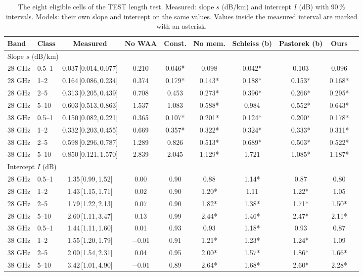 \documentclass[reprint,aps,pra,amsmath,amssymb,nofootinbib,superscriptaddress]{revtex4-2}
\newcommand{\iv}[2]{\,[#1,\,#2]}
\begin{document}
\begin{table}[t]
\caption{The eight eligible cells of the TEST length test. Measured: slope $s$ (dB/km) and intercept $I$ (dB) with 90\,\%
intervals. Models: their own slope and intercept on the same values. Values inside the measured interval are marked with an
asterisk.}
\label{tab:cells}
\begin{ruledtabular}
\begin{tabular}{llcccccccc}
Band & Class & Measured & No WAA & Const. & No mem. & Schleiss (b) & Pastorek (b) & Ours\\
\hline
\multicolumn{9}{l}{Slope $s$ (dB/km)}\\
28 GHz & 0.5--1 & 0.037\iv{0.014}{0.077} & 0.210 & 0.046* & 0.098 & 0.042* & 0.103 & 0.096\\
28 GHz & 1--2 & 0.164\iv{0.086}{0.234} & 0.374 & 0.179* & 0.143* & 0.188* & 0.153* & 0.168*\\
28 GHz & 2--5 & 0.313\iv{0.205}{0.439} & 0.708 & 0.453 & 0.273* & 0.396* & 0.266* & 0.295*\\
28 GHz & 5--10 & 0.603\iv{0.513}{0.863} & 1.537 & 1.083 & 0.588* & 0.984 & 0.552* & 0.643*\\
38 GHz & 0.5--1 & 0.150\iv{0.082}{0.221} & 0.365 & 0.107* & 0.201* & 0.124* & 0.200* & 0.178*\\
38 GHz & 1--2 & 0.332\iv{0.203}{0.455} & 0.669 & 0.357* & 0.322* & 0.324* & 0.333* & 0.311*\\
38 GHz & 2--5 & 0.598\iv{0.296}{0.787} & 1.289 & 0.826 & 0.513* & 0.689* & 0.503* & 0.522*\\
38 GHz & 5--10 & 0.850\iv{0.121}{1.570} & 2.839 & 2.045 & 1.129* & 1.721 & 1.085* & 1.187*\\
\multicolumn{9}{l}{Intercept $I$ (dB)}\\
28 GHz & 0.5--1 & 1.35\iv{0.99}{1.52} & 0.00 & 0.90 & 0.88 & 1.14* & 0.87 & 0.80\\
28 GHz & 1--2 & 1.43\iv{1.15}{1.71} & 0.02 & 0.90 & 1.20* & 1.11 & 1.22* & 1.05\\
28 GHz & 2--5 & 1.79\iv{1.22}{2.13} & 0.07 & 0.90 & 1.82* & 1.38* & 1.71* & 1.50*\\
28 GHz & 5--10 & 2.60\iv{1.11}{3.47} & 0.13 & 0.99 & 2.44* & 1.46* & 2.47* & 2.11*\\
38 GHz & 0.5--1 & 1.44\iv{1.11}{1.60} & 0.01 & 0.93 & 0.93 & 1.18* & 0.93 & 0.87\\
38 GHz & 1--2 & 1.55\iv{1.20}{1.79} & $-0.01$ & 0.91 & 1.21* & 1.23* & 1.24* & 1.09\\
38 GHz & 2--5 & 2.00\iv{1.54}{2.31} & 0.04 & 0.95 & 2.00* & 1.57* & 1.86* & 1.66*\\
38 GHz & 5--10 & 3.42\iv{1.01}{4.90} & $-0.01$ & 0.89 & 2.64* & 1.68* & 2.60* & 2.28*\\
\end{tabular}
\end{ruledtabular}
\end{table}
\end{document}
